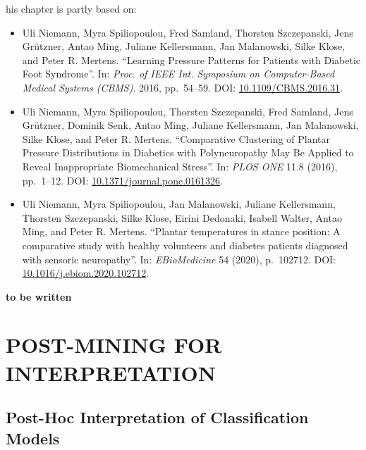 \documentclass[
  oneside]{book}
\providecommand{\tightlist}{%
  \setlength{\itemsep}{0pt}\setlength{\parskip}{0pt}}
\newenvironment{infobox}[1]
  {
  \begin{chapter-summary}
  }
  {
  \end{chapter-summary}
  }
\begin{document}
\begin{infobox}

This chapter is partly based on:

\begin{itemize}
\tightlist
\item
  Uli Niemann, Myra Spiliopoulou, Fred Samland, Thorsten Szczepanski, Jens Grützner, Antao Ming, Juliane Kellersmann, Jan Malanowski, Silke Klose, and Peter R. Mertens. ``Learning Pressure Patterns for Patients with Diabetic Foot Syndrome''. In: \emph{Proc. of IEEE Int. Symposium on Computer-Based Medical Systems (CBMS)}. 2016, pp.~54--59. DOI: \href{https://doi.org/10.1109\%2FCBMS.2016.31}{10.1109/CBMS.2016.31}.
\item
  Uli Niemann, Myra Spiliopoulou, Thorsten Szczepanski, Fred Samland, Jens Grützner, Dominik Senk, Antao Ming, Juliane Kellersmann, Jan Malanowski, Silke Klose, and Peter R. Mertens. ``Comparative Clustering of Plantar Pressure Distributions in Diabetics with Polyneuropathy May Be Applied to Reveal Inappropriate Biomechanical Stress''. In: \emph{PLOS ONE} 11.8 (2016), pp.~1--12. DOI: \href{https://doi.org/10.1371\%2Fjournal.pone.0161326}{10.1371/journal.pone.0161326}.
\item
  Uli Niemann, Myra Spiliopoulou, Jan Malanowski, Juliane Kellersmann, Thorsten Szczepanski, Silke Klose, Eirini Dedonaki, Isabell Walter, Antao Ming, and Peter R. Mertens. ``Plantar temperatures in stance position: A comparative study with healthy volunteers and diabetes patients diagnosed with sensoric neuropathy''. In: \emph{EBioMedicine} 54 (2020), p.~102712. DOI: \href{https://doi.org/10.1016\%2Fj.ebiom.2020.102712}{10.1016/j.ebiom.2020.102712}.
\end{itemize}

\end{infobox}

\textbf{to be written}

\hypertarget{part-post-mining-for-interpretation}{%
\part{POST-MINING FOR INTERPRETATION}\label{part-post-mining-for-interpretation}}

\hypertarget{iml}{%
\chapter{Post-Hoc Interpretation of Classification Models}\label{iml}}
\end{document}
